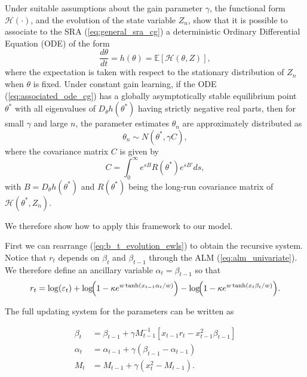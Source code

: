 \documentclass[11pt]{article}
\begin{document}
Under suitable assumptions about the gain parameter $\gamma$, the functional form $\mathcal{H}(\cdot)$, and the evolution of the state variable $Z_n$,
\cite{GeorgeWEvans2001} show that it is possible to associate to the SRA (\ref{eq:general_sra_cg}) a deterministic Ordinary Differential Equation (ODE) of the form
\begin{equation}\label{eq:associated_ode_cg}
    \frac{d\theta}{dt} = h(\theta) = \mathbb{E}\left[\mathcal{H}(\theta, Z)\right],
\end{equation}
where the expectation is taken with respect to the stationary distribution of $Z_n$ when $\theta$ is fixed.
Under constant gain learning, if the ODE (\ref{eq:associated_ode_cg}) has a globally asymptotically stable equilibrium point $\theta^*$ with all eigenvalues of $D_\theta h(\theta^*)$ having strictly negative real parts, then for small $\gamma$ and large $n$, the parameter estimates $\theta_n$ are approximately distributed as
\begin{equation}
    \theta_n \sim N\left(\theta^*, \gamma C\right),
\end{equation}
where the covariance matrix $C$ is given by
\begin{equation}
    C = \int_0^\infty e^{sB} R(\theta^*) e^{sB'} ds,
\end{equation}
with $B = D_\theta h(\theta^*)$ and $R(\theta^*)$ being the long-run covariance matrix of $\mathcal{H}(\theta^*, Z_n)$.

We therefore show how to apply this framework to our model.

First we can rearrange (\ref{eq:b_t_evolution_ewls}) to obtain the recursive system. 
Notice that $r_t$ depends on $\beta_t$ and $\beta_{t-1}$ through the ALM (\ref{eq:alm_univariate}).
We therefore define an ancillary variable $\alpha_t = \beta_{t-1}$ so that
\begin{equation}
    r_t = \log(\varepsilon_t)
    + \log\!\Bigl(1 - \kappa e^{w \tanh(x_{t-1} \alpha_t / w)}\Bigr)
    - \log\!\Bigl(1 - \kappa e^{w \tanh(x_t \beta_t / w)}\Bigr).
\end{equation} 

The full updating system for the parameters can be written as

\begin{equation}
    \begin{aligned}
        \beta_t &= \beta_{t-1} + \gamma M_{t-1}^{-1} \left[ x_{t-1} r_t - x_{t-1}^2 \beta_{t-1} \right] \\
        \alpha_t &= \alpha_{t-1} + \gamma (\beta_{t-1} - \alpha_{t-1}) \\
        M_t &= M_{t-1} + \gamma \left(x_t^2 - M_{t-1} \right).
    \end{aligned}
\end{equation}
\end{document}
